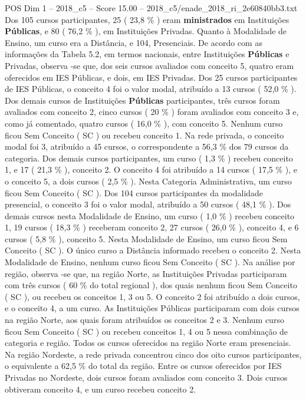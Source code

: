 \begin{textsample}{POS Dim 1 – 2018\_c5 – Score 15.00 – 2018\_c5/enade\_2018\_ri\_2e60840bb3.txt}
Dos 105 cursos participantes, 25 ( 23,8 \% ) eram \textbf{ministrados} em Instituições \textbf{Públicas}, e 80 ( 76,2 \% ), em Instituições Privadas.
Quanto à Modalidade de Ensino, um curso era a Distância, e 104, Presenciais.
De acordo com as informações da Tabela 5.2, em termos nacionais, entre Instituições \textbf{Públicas} e Privadas, observa -se que, dos seis cursos avaliados com conceito 5, quatro eram oferecidos em IES Públicas, e dois, em IES Privadas.
Dos 25 cursos participantes de IES Públicas, o conceito 4 foi o valor modal, atribuído a 13 cursos ( 52,0 \% ).
Dos demais cursos de Instituições \textbf{Públicas} participantes, três cursos foram avaliados com conceito 2, cinco cursos ( 20 \% ) foram avaliados com conceito 3 e, como já comentado, quatro cursos ( 16,0 \% ), com conceito 5.
Nenhum curso ficou Sem Conceito ( SC ) ou recebeu conceito 1.
Na rede privada, o conceito modal foi 3, atribuído a 45 cursos, o correspondente a 56,3 \% dos 79 cursos da categoria.
Dos demais cursos participantes, um curso ( 1,3 \% ) recebeu conceito 1, e 17 ( 21,3 \% ), conceito 2.
O conceito 4 foi atribuído a 14 cursos ( 17,5 \% ), e o conceito 5, a dois cursos ( 2,5 \% ).
Nesta Categoria Administrativa, um curso ficou Sem Conceito ( SC ).
Dos 104 cursos participantes da modalidade presencial, o conceito 3 foi o valor modal, atribuído a 50 cursos ( 48,1 \% ).
Dos demais cursos nesta Modalidade de Ensino, um curso ( 1,0 \% ) recebeu conceito 1, 19 cursos ( 18,3 \% ) receberam conceito 2, 27 cursos ( 26,0 \% ), conceito 4, e 6 cursos ( 5,8 \% ), conceito 5.
Nesta Modalidade de Ensino, um curso ficou Sem Conceito ( SC ).
O único curso a Distância informado recebeu o conceito 2.
Nesta Modalidade de Ensino, nenhum curso ficou Sem Conceito ( SC ).
Na análise por região, observa -se que, na região Norte, as Instituições Privadas participaram com três cursos ( 60 \% do total regional ), dos quais nenhum ficou Sem Conceito ( SC ), ou recebeu os conceitos 1, 3 ou 5.
O conceito 2 foi atribuído a dois cursos, e o conceito 4, a um curso.
As Instituições Públicas participaram com dois cursos na região Norte, aos quais foram atribuídos os conceitos 2 e 3.
Nenhum curso ficou Sem Conceito ( SC ) ou recebeu conceitos 1, 4 ou 5 nessa combinação de categoria e região.
Todos os cursos oferecidos na região Norte eram presenciais.
Na região Nordeste, a rede privada concentrou cinco dos oito cursos participantes, o equivalente a 62,5 \% do total da região.
Entre os cursos oferecidos por IES Privadas no Nordeste, dois cursos foram avaliados com conceito 3.
Dois cursos obtiveram conceito 4, e um curso recebeu conceito 2.

\end{textsample}
